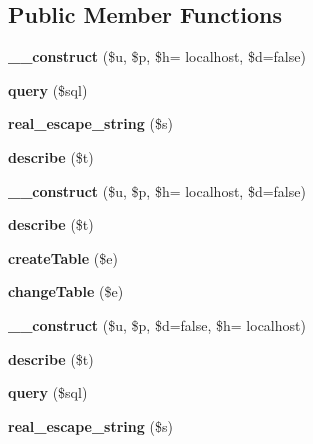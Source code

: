 \subsection*{Public Member Functions}
\begin{DoxyCompactItemize}
\item 
\hypertarget{classstore_ac6766462e1ba4cf747c89153c158e856}{}{\bfseries \+\_\+\+\_\+construct} (\$u, \$p, \$h= \textquotesingle{}localhost\textquotesingle{}, \$d=false)\label{classstore_ac6766462e1ba4cf747c89153c158e856}

\item 
\hypertarget{classstore_a65f535dfea7bcca33de5078d2bd8f18a}{}{\bfseries query} (\$sql)\label{classstore_a65f535dfea7bcca33de5078d2bd8f18a}

\item 
\hypertarget{classstore_a5ba951e504b410d9442d120e9492393c}{}{\bfseries real\+\_\+escape\+\_\+string} (\$s)\label{classstore_a5ba951e504b410d9442d120e9492393c}

\item 
\hypertarget{classstore_ac69e064cf1e0228d17a98c91d19bc627}{}{\bfseries describe} (\$t)\label{classstore_ac69e064cf1e0228d17a98c91d19bc627}

\item 
\hypertarget{classstore_ac6766462e1ba4cf747c89153c158e856}{}{\bfseries \+\_\+\+\_\+construct} (\$u, \$p, \$h= \textquotesingle{}localhost\textquotesingle{}, \$d=false)\label{classstore_ac6766462e1ba4cf747c89153c158e856}

\item 
\hypertarget{classstore_ac69e064cf1e0228d17a98c91d19bc627}{}{\bfseries describe} (\$t)\label{classstore_ac69e064cf1e0228d17a98c91d19bc627}

\item 
\hypertarget{classstore_a0204fa2a45127ada1589be8e22592522}{}{\bfseries create\+Table} (\$e)\label{classstore_a0204fa2a45127ada1589be8e22592522}

\item 
\hypertarget{classstore_a46e1b2faa9560a512788cc1bf437e047}{}{\bfseries change\+Table} (\$e)\label{classstore_a46e1b2faa9560a512788cc1bf437e047}

\item 
\hypertarget{classstore_a7e1de9852edc997e475aac1f1597730e}{}{\bfseries \+\_\+\+\_\+construct} (\$u, \$p, \$d=false, \$h= \textquotesingle{}localhost\textquotesingle{})\label{classstore_a7e1de9852edc997e475aac1f1597730e}

\item 
\hypertarget{classstore_ac69e064cf1e0228d17a98c91d19bc627}{}{\bfseries describe} (\$t)\label{classstore_ac69e064cf1e0228d17a98c91d19bc627}

\item 
\hypertarget{classstore_a65f535dfea7bcca33de5078d2bd8f18a}{}{\bfseries query} (\$sql)\label{classstore_a65f535dfea7bcca33de5078d2bd8f18a}

\item 
\hypertarget{classstore_a5ba951e504b410d9442d120e9492393c}{}{\bfseries real\+\_\+escape\+\_\+string} (\$s)\label{classstore_a5ba951e504b410d9442d120e9492393c}

\end{DoxyCompactItemize}
